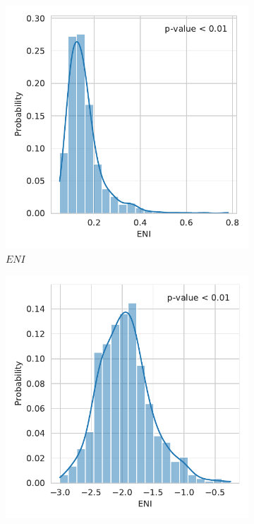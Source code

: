\documentclass[12pt,a4paper]{article}
\begin{document}
\begin{figure}[htbp]
\centering
\begin{subfigure}{0.45\textwidth}
\includegraphics[width=\textwidth]{./plots/dis/distplot_ENI.pdf}
\caption{$ENI$}
\end{subfigure}
\begin{subfigure}{0.45\textwidth}
\includegraphics[width=\textwidth]{./plots/dis/distplot_lnENI.pdf}

\end{subfigure}
\end{figure}
\end{document}
